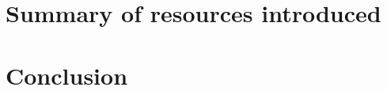    
               
      


   
\section{Summary of resources introduced}
\label{sec:sumresch8}

\section{Conclusion}


